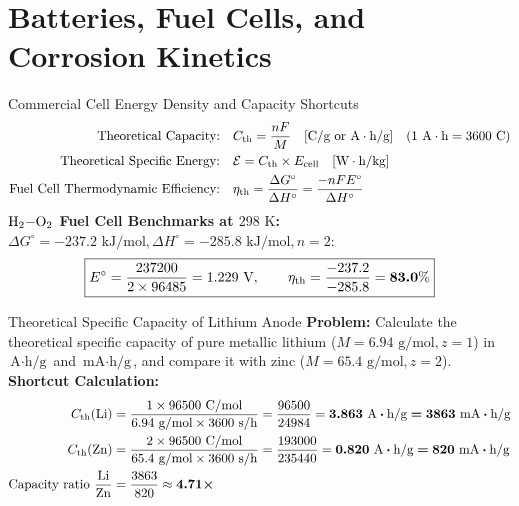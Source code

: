 \documentclass[11pt,a4paper]{report}
\newcommand{\ans}[1]{\ifmmode\bm{#1}\else\textbf{#1}\fi}
\begin{document}
\chapter{Batteries, Fuel Cells, and Corrosion Kinetics}

\begin{shortcutbox}{Commercial Cell Energy Density and Capacity Shortcuts}
\begin{align}
\text{Theoretical Capacity:} \quad & C_{\rm th} = \frac{n F}{M} \quad [\text{C/g or A}\cdot\text{h/g}] \quad (1\text{ A}\cdot\text{h} = 3600\text{ C}) \\
\text{Theoretical Specific Energy:} \quad & \mathcal{E} = C_{\rm th} \times E_{\rm cell} \quad [\text{W}\cdot\text{h/kg}] \\
\text{Fuel Cell Thermodynamic Efficiency:} \quad & \eta_{\rm th} = \frac{\Delta G^\circ}{\Delta H^\circ} = \frac{-n F E^\circ}{\Delta H^\circ}
\end{align}
\textbf{$\ce{H2-O2}$ Fuel Cell Benchmarks at $298\text{ K}$:}
$\Delta G^\circ = -237.2\text{ kJ/mol}, \Delta H^\circ = -285.8\text{ kJ/mol}, n = 2$:
\begin{equation}
\boxed{
E^\circ = \frac{237200}{2 \times 96485} = 1.229\text{ V}, \qquad \eta_{\rm th} = \frac{-237.2}{-285.8} = \bm{83.0\%}
}
\end{equation}
\end{shortcutbox}

\begin{microbox}{Theoretical Specific Capacity of Lithium Anode}
\textbf{Problem:} Calculate the theoretical specific capacity of pure metallic lithium ($M = 6.94\text{ g/mol}, z = 1$) in $\text{A}\cdot\text{h/g}$ and $\text{mA}\cdot\text{h/g}$, and compare it with zinc ($M = 65.4\text{ g/mol}, z = 2$).\\
\textbf{Shortcut Calculation:}
\begin{align*}
C_{\rm th}(\ce{Li}) &= \frac{1 \times 96500\text{ C/mol}}{6.94\text{ g/mol} \times 3600\text{ s/h}} = \frac{96500}{24984} = \ans{3.863\text{ A}\cdot\text{h/g} = 3863\text{ mA}\cdot\text{h/g}} \\
C_{\rm th}(\ce{Zn}) &= \frac{2 \times 96500\text{ C/mol}}{65.4\text{ g/mol} \times 3600\text{ s/h}} = \frac{193000}{235440} = \ans{0.820\text{ A}\cdot\text{h/g} = 820\text{ mA}\cdot\text{h/g}} \\
\text{Capacity ratio } \frac{\ce{Li}}{\ce{Zn}} &= \frac{3863}{820} \approx \ans{4.71\times}
\end{align*}
\end{microbox}
\end{document}
